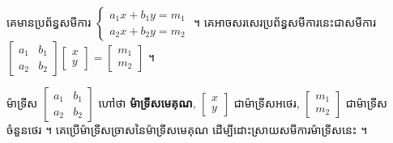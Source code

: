 \begin{example}[ឧទាហរណ៍ ១]
គេមានប្រព័ន្ធសមីការ $\begin{cases} a_1x + b_1y = m_1\\ a_2x + b_2y = m_2 \end{cases}$ ។ គេអាចសរសេរប្រព័ន្ធសមីការនេះជាសមីការ $\begin{bmatrix} a_1 & b_1\\ a_2 & b_2 \end{bmatrix}\begin{bmatrix} x\\ y \end{bmatrix} = \begin{bmatrix} m_1\\ m_2 \end{bmatrix}$ ។

ម៉ាទ្រីស $\begin{bmatrix} a_1 & b_1\\ a_2 & b_2 \end{bmatrix}$ ហៅថា \textbf{ម៉ាទ្រីសមេគុណ}, $\begin{bmatrix} x\\ y \end{bmatrix}$ ជាម៉ាទ្រីសអថេរ, $\begin{bmatrix} m_1\\ m_2 \end{bmatrix}$ ជាម៉ាទ្រីសចំនួនថេរ ។ គេប្រើម៉ាទ្រីសច្រាសនៃម៉ាទ្រីសមេគុណ ដើម្បីដោះស្រាយសមីការម៉ាទ្រីសនេះ ។


\end{example}
